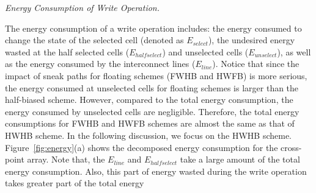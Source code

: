 \vspace{6pt} \emph{Energy Consumption of Write Operation.} \vspace{6pt}

The energy consumption of a write operation includes: the energy consumed
to change the state of the selected cell (denoted as $E_{select}$), the
undesired energy wasted at the half selected cells ($E_{halfselect}$) and
unselected cells ($E_{unselect}$), as well as the energy consumed by the
interconnect lines ($E_{line}$). Notice that since the impact of sneak
paths for floating schemes (FWHB and HWFB) is more serious, the energy
consumed at unselected cells for floating schemes is larger than the
half-biased scheme. However, compared to the total energy consumption, the
energy consumed by unselected cells are negligible. Therefore, the total
energy consumptions for FWHB and HWFB schemes are almost the same as that
of HWHB scheme. In the following discussion, we focus on the HWHB scheme.
Figure~\ref{fig:energy}(a) shows the decomposed energy consumption for the
cross-point array. Note that, the $E_{line}$ and $E_{halfselect}$ take a
large amount of the total energy consumption. Also, this part of energy
wasted during the write operation takes greater part of the total energy

